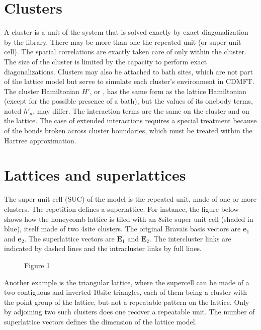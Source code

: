 \documentclass[letterpaper,10pt,english]{sphinxmanual}
\let\sphinxpxdimen\pdfpxdimen\else\newdimen\sphinxpxdimen
\begin{document}
\section{Clusters}
\label{\detokenize{models:clusters}}
\sphinxAtStartPar
A cluster is a unit of the system that is solved exactly by exact diagonalization by the  library. There may be more than one the repeated unit (or super unit cell). The spatial correlations are exactly taken care of only within the cluster. The size of the cluster is limited by the capacity to perform exact diagonalizations. Clusters may also be attached to bath sites, which are not part of the lattice model  but serve to simulate each cluster’s environment in CDMFT.
The cluster Hamiltonian \(H'\), or , has the same form as the lattice Hamiltonian (except for the possible presence of a bath), but the values of its one\sphinxhyphen{}body terms, noted \(h'_a\), may differ. The interaction terms are the same on the cluster and on the lattice. The case of extended interactions requires a special treatment because of the bonds broken across cluster boundaries, which must be treated within the Hartree approximation.


\section{Lattices and superlattices}
\label{\detokenize{models:lattices-and-superlattices}}
\sphinxAtStartPar
The super unit cell (SUC) of the model is the repeated unit, made of one or more clusters.
The repetition defines a superlattice. For instance, the figure below shows how the honeycomb lattice is tiled with an 8\sphinxhyphen{}site super unit cell (shaded in blue), itself made of two 4\sphinxhyphen{}site clusters. The original Bravais basis vectors are \(\mathbf{e}_1\) and \(\mathbf{e}_2\). The superlattice vectors are \(\mathbf{E}_1\) and \(\mathbf{E}_2\). The inter\sphinxhyphen{}cluster links are indicated by dashed lines and the intra\sphinxhyphen{}cluster links by full lines.

\begin{figure}[htbp]
\centering
\capstart

\noindent\sphinxincludegraphics[height=300\sphinxpxdimen]{{h8}.png}
\caption{Figure 1}\label{\detokenize{models:id1}}\end{figure}

\sphinxAtStartPar
Another example is the triangular lattice, where the supercell can be made of a two contiguous and inverted 10\sphinxhyphen{}site triangles, each of them being a cluster with the point group of the lattice, but not a repeatable pattern on the lattice. Only by adjoining two such clusters does one recover a repeatable unit.
The number of superlattice vectors defines the dimension of the lattice model.
\end{document}
